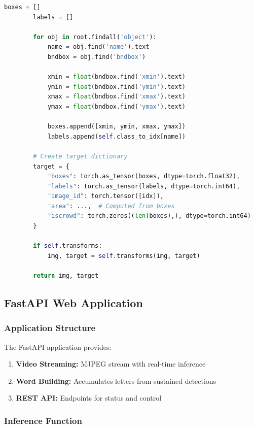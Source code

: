 \documentclass[12pt,a4paper]{article}
\begin{document}
\begin{lstlisting}[language=python, caption=SignLanguageDataset Class]
        boxes = []
        labels = []
        
        for obj in root.findall('object'):
            name = obj.find('name').text
            bndbox = obj.find('bndbox')
            
            xmin = float(bndbox.find('xmin').text)
            ymin = float(bndbox.find('ymin').text)
            xmax = float(bndbox.find('xmax').text)
            ymax = float(bndbox.find('ymax').text)
            
            boxes.append([xmin, ymin, xmax, ymax])
            labels.append(self.class_to_idx[name])
        
        # Create target dictionary
        target = {
            "boxes": torch.as_tensor(boxes, dtype=torch.float32),
            "labels": torch.as_tensor(labels, dtype=torch.int64),
            "image_id": torch.tensor([idx]),
            "area": ...,  # Computed from boxes
            "iscrowd": torch.zeros((len(boxes),), dtype=torch.int64)
        }
        
        if self.transforms:
            img, target = self.transforms(img, target)
        
        return img, target
\end{lstlisting}

\subsection{FastAPI Web Application}

\subsubsection{Application Structure}

The FastAPI application provides:

\begin{enumerate}
    \item \textbf{Video Streaming:} MJPEG stream with real-time inference
    \item \textbf{Word Building:} Accumulates letters from sustained detections
    \item \textbf{REST API:} Endpoints for status and control
\end{enumerate}

\subsubsection{Inference Function}
\end{document}
